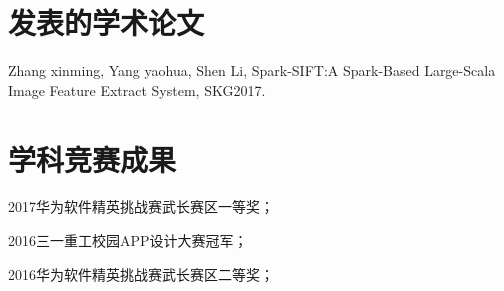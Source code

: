 ﻿\begin{resume}

  \section*{发表的学术论文} %

  \begin{enumerate}[{[}1{]}]
  \addtolength{\itemsep}{-.36\baselineskip}%
  \item Zhang xinming, Yang yaohua, Shen Li, Spark-SIFT:A Spark-Based Large-Scala Image Feature Extract System, SKG2017.
  \end{enumerate}

  \section*{学科竞赛成果} %
  \begin{enumerate}[{[}1{]}]
  \addtolength{\itemsep}{-.36\baselineskip}%
  \item 2017华为软件精英挑战赛武长赛区一等奖；
  \item 2016三一重工校园APP设计大赛冠军；
  \item 2016华为软件精英挑战赛武长赛区二等奖；
  \end{enumerate}
\end{resume}
